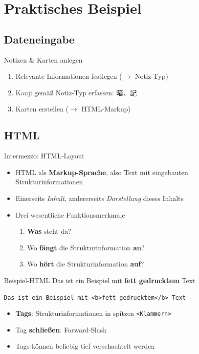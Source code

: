 \documentclass[aspectratio=169,compress]{beamer}
\begin{document}
\section{Praktisches Beispiel}
\subsection{Dateneingabe}

\begin{frame}{Notizen \& Karten anlegen}
	\begin{enumerate}
		\item Relevante Informationen festlegen ($\rightarrow$ Notiz-Typ) \pause
		\item Kanji gemäß Notiz-Typ erfassen: 暗、記 \pause
		\item Karten erstellen ($\rightarrow$ HTML-Markup)
	\end{enumerate}
\end{frame}

\subsection{HTML}

\begin{frame}{Intermezzo: HTML-Layout}
	\begin{itemize}
		\item HTML als \textbf{Markup-Sprache}, also Text mit eingebauten Strukturinformationen
		\item Einerseits \textit{Inhalt}, andererseits \textit{Darstellung} dieses Inhalts \pause
		\item Drei wesentliche Funktionsmerkmale
		\begin{enumerate}
			\item \textbf{Was} steht da?
			\item Wo \textbf{fängt} die Strukturinformation \textbf{an}?
			\item Wo \textbf{hört} die Strukturinformation \textbf{auf}?
		\end{enumerate}
	\end{itemize}
\end{frame}

\begin{frame}{Beispiel-HTML}
	Das ist ein Beispiel mit \textbf{fett gedrucktem} Text \par \pause
	\texttt{Das ist ein Beispiel mit <b>fett gedrucktem</b> Text} \pause
	\begin{itemize}
		\item \textbf{Tags}: Strukturinformationen in spitzen \texttt{<Klammern>}
		\item Tag \textbf{schließen}: Forward-Slash
		\item Tags können beliebig tief verschachtelt werden
	\end{itemize}
\end{frame}
\end{document}
